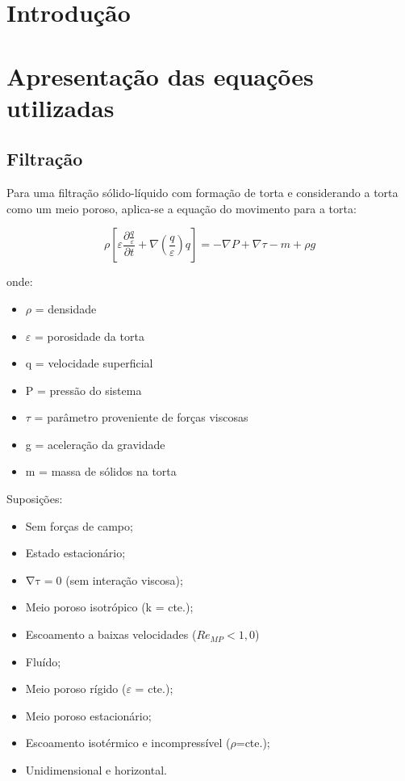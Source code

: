 \chapter{Introdução}



\chapter{Apresentação das equações utilizadas}

\section{Filtração}


Para uma filtração sólido-líquido com formação de torta e considerando a torta como um meio poroso, aplica-se a equação do movimento para a torta:



\begin{equation}\label{key}
\rho\left[\varepsilon \frac{\partial \frac{q}{\varepsilon}}{\partial t}+\nabla\left(\frac{q}{\varepsilon}\right) q\right]=-\nabla P+\nabla \tau-m+\rho g
\end{equation}


onde:

\begin{itemize}

\item $\rho$ = densidade
\item $\varepsilon$ = porosidade da torta
\item q = velocidade superficial
\item P = pressão do sistema
\item $\tau$ = parâmetro proveniente de forças viscosas
\item g = aceleração da gravidade
\item m = massa de sólidos na torta

\end{itemize}

Suposições:

\begin{itemize}
\item Sem forças de campo;
\item Estado estacionário;
\item $\mathrm{\nabla\tau}= 0$ (sem interação viscosa);
\item Meio poroso isotrópico (k = cte.);
\item Escoamento a baixas velocidades ($Re_{MP}<1,0$)
\item Fluído;
\item Meio poroso rígido ($\varepsilon$ = cte.);
\item Meio poroso estacionário;
\item Escoamento isotérmico e incompressível ($\rho$=cte.);
\item Unidimensional e horizontal.
\end{itemize}

